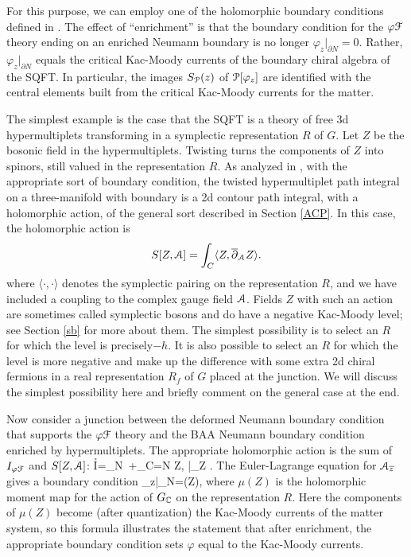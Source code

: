 \documentclass[11pt,a4paper]{article}
\begin{document}
For this purpose, we can employ one of the holomorphic boundary conditions defined in \cite{Costello:2018fnz}.   The effect of ``enrichment'' is
that the boundary condition for the $\varphi\cF$ theory ending on an enriched Neumann boundary is no longer $\varphi_z|_{\partial N}=0$. Rather, $\varphi_z|_{\partial N}$ 
 equals the critical Kac-Moody currents of the boundary chiral algebra of the SQFT. In particular, the images $S_{\P}(z)$ of $\P[\varphi_z]$ are identified with the central elements built from the critical Kac-Moody currents for the matter. 

The simplest example is the case that the SQFT is a theory of free 3d hypermultiplets  transforming in a symplectic representation $R$ of $G$. Let $Z$ be
the bosonic field in the hypermultiplets.  Twisting turns the components of 
 $Z$  into spinors, still valued in the representation $R$.
As analyzed in  \cite{Gaiotto:2016hvd}, with the appropriate sort of boundary condition, the twisted hypermultiplet path integral on a three-manifold
with boundary is a 2d contour path integral, with a holomorphic action, of the general sort described in Section \ref{ACP}.   In this case, the holomorphic action is
\begin{equation}
S[Z,\cA] = \int_C \langle Z, \bar \partial_\cA Z \rangle .
\end{equation} 
where  $\langle \cdot,\cdot \rangle$ denotes the symplectic pairing on the representation $R$, and we have included a coupling to the complex gauge
field $\cA$. Fields $Z$ with such an action are sometimes called symplectic bosons and do have a negative Kac-Moody level; see Section \ref{sb} for more about them. The simplest possibility is to select an $R$ for which the level is precisely$-h$. It is also possible to select an $R$
for which the level is more negative and make up the difference with some extra 2d chiral fermions in a real representation $R_f$ of $G$ placed at the junction. We will discuss the simplest possibility here and briefly comment on the general case at the end. 

 Now consider a junction between the deformed Neumann boundary condition that supports the $\varphi\cF $ theory and the
BAA Neumann boundary condition enriched by hypermultiplets.   The appropriate holomorphic action is the sum of $I_{\varphi\cF}$ and $S[Z,\cA]$:
\be\label{welli}\h I=\int_N \Tr\,\varphi \cF +\int_{C=\partial N}  \langle Z, \bar \partial_\cA Z \rangle .\ee
The Euler-Lagrange equation for $\cA_{\bar z}$ gives a boundary condition
\be\label{nell}\varphi_z|_{\partial N}=\mu(Z), \ee
where $\mu(Z)$ is the holomorphic moment map for the action of $G_\C$ on the representation $R$.  Here the components of $\mu(Z)$ become
(after quantization)  the Kac-Moody
currents of the matter system, so this formula illustrates the statement that after enrichment, the appropriate boundary condition sets $\varphi$ equal to the Kac-Moody currents.  
\end{document}
